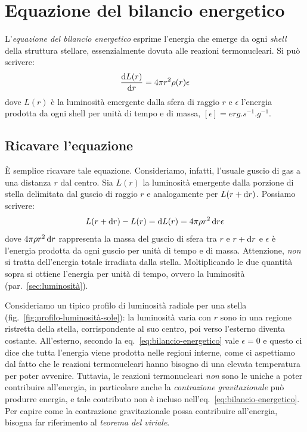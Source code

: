 \section{Equazione del bilancio energetico}\label{sec:bilancio-energetico}
L'\emph{equazione del bilancio energetico} esprime l'energia che emerge da ogni \emph{shell} della struttura stellare, essenzialmente dovuta alle reazioni termonucleari. Si può scrivere:
\begin{equation}\label{eq:bilancio-energetico}
    \dfrac{\mathop{\mathrm{{}d}}\mathopen{} L(r)}{\mathop{\mathrm{{}d}}\mathopen{} r} = 4 \pi r^2 \rho(r) \epsilon
\end{equation}
dove $L(r)$ è la luminosità emergente dalla sfera di raggio $r$ e $\epsilon$ l'energia prodotta da ogni shell per unità di tempo e di massa, $[\epsilon] = \si{erg.s^{-1}.g^{-1}}$.

\subsection{Ricavare l'equazione}
È semplice ricavare tale equazione. Consideriamo, infatti, l'usuale guscio di gas a una distanza $r$ dal centro. Sia $L(r)$ la luminosità emergente dalla porzione di stella delimitata dal guscio di raggio $r$ e analogamente per $L(r + \mathop{\mathrm{{}d}}\mathopen{} r)$. Possiamo scrivere:
\[
L(r + \mathop{\mathrm{{}d}}\mathopen{} r) - L(r) = \mathop{\mathrm{{}d}}\mathopen{} L(r) = 4 \pi \rho r^2 \mathop{\mathrm{{}d}}\mathopen{} r \epsilon
\]
dove $4 \pi \rho r^2 \mathop{\mathrm{{}d}}\mathopen{} r$ rappresenta la massa del guscio di sfera tra $r$ e $r + \mathop{\mathrm{{}d}}\mathopen{} r$ e $\epsilon$ è l'energia prodotta da ogni guscio per unità di tempo e di massa. Attenzione, \emph{non} si tratta dell'energia totale irradiata dalla stella. Moltiplicando le due quantità sopra si ottiene l'energia per unità di tempo, ovvero la luminosità (par.~\ref{sec:luminosità}).

Consideriamo un tipico profilo di luminosità radiale per una stella (fig.~\ref{fig:profilo-luminosità-sole}): la luminosità varia con $r$ sono in una regione ristretta della stella, corrispondente al suo centro, poi verso l'esterno diventa costante. All'esterno, secondo la eq.~\eqref{eq:bilancio-energetico} vale $\epsilon = 0$ e questo ci dice che tutta l'energia viene prodotta nelle regioni interne, come ci aspettiamo dal fatto che le reazioni termonucleari hanno bisogno di una elevata temperatura per poter avvenire. Tuttavia, le reazioni termonucleari \emph{non} sono le uniche a poter contribuire all'energia, in particolare anche la \emph{contrazione gravitazionale} può produrre energia, e tale contributo non è incluso nell'eq.~\eqref{eq:bilancio-energetico}. Per capire come la contrazione gravitazionale possa contribuire all'energia, bisogna far riferimento al \emph{teorema del viriale}.

